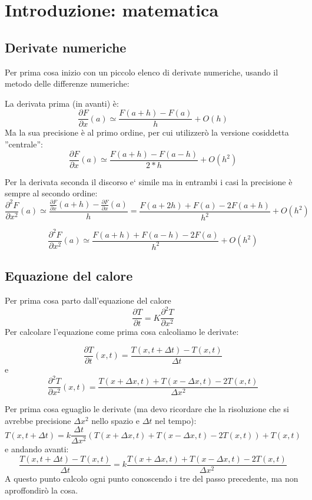 \documentclass[]{article}
\title{}
\author{Daniele Rapetti}
\date{}
\newcommand{\pde}[2]{\ensuremath{\frac{\partial #1}{\partial #2}}}
\newcommand{\lr}[3]{\ensuremath{\left#1 #3 \right#2}}
\newcommand{\lrt}[1]{\lr{(}{)}{#1}}
\numberwithin{equation}{subsection}
\begin{document}
\section{Introduzione: matematica}
\subsection{Derivate numeriche}
Per prima cosa inizio con un piccolo elenco di derivate numeriche, usando il metodo delle differenze numeriche:

La derivata prima (in avanti) \`e:
\begin{equation}
\pde{F}x(a) \simeq \frac{F(a+h)-F(a)}{h} + O(h)
\end{equation}
Ma la sua precisione \`e al primo ordine, per cui utilizzer\`o la versione cosiddetta ''centrale'':
\begin{equation}
\pde{F}x(a) \simeq \frac{F(a+h)-F(a-h)}{2*h} + O(h^2)
\end{equation}

Per la derivata seconda il discorso e` simile ma in entrambi i casi la precisione \`e sempre al secondo ordine:
\begin{equation}
\pde{^2F}{x^2}(a) \simeq \frac{\pde{F}x(a+h)-\pde{F}x(a)}{h} = \frac{F(a+2h)+F(a)-2F(a+h)}{h^2} + O(h^2)
\end{equation}

\begin{equation}
\pde{^2F}{x^2}(a) \simeq  \frac{F(a+h)+F(a-h)-2F(a)}{h^2} + O(h^2)
\end{equation}
\subsection{Equazione del calore}
Per prima cosa parto dall'equazione del calore
\begin{equation}\label{eq:calore}
\pde Tt =K \pde{^2T}{x^2}
\end{equation}
Per calcolare l'equazione come prima cosa calcoliamo le derivate:

\begin{equation}
\pde Tt\lrt{x,t} = \frac{T(x,t+\Delta t)-T(x,t)}{\Delta t}
\end{equation}
e
\begin{equation}
\pde{^2T}{x^2}(x,t) = \frac{T(x+\Delta x,t)+T(x-\Delta x,t)-2T(x,t)}{\Delta x^2}
\end{equation}

Per prima cosa eguaglio le derivate (ma devo ricordare che la risoluzione che si avrebbe precisione $\Delta x^2$ nello spazio e $\Delta t$ nel tempo):
\begin{equation}
T(x,t+\Delta t) = k\frac{\Delta t}{\Delta x^2} \lrt{T(x+\Delta x,t)+T(x-\Delta x,t)-2T(x,t)} + T(x,t)
\end{equation}
e andando avanti:
\begin{equation}
\frac{T(x,t+\Delta t)-T(x,t)}{\Delta t} = k \frac{T(x+\Delta x,t)+T(x-\Delta x,t)-2T(x,t)}{\Delta x^2}
\end{equation}
A questo punto calcolo ogni punto conoscendo i tre del passo precedente, ma non aproffondir\`o la cosa.
\end{document}
